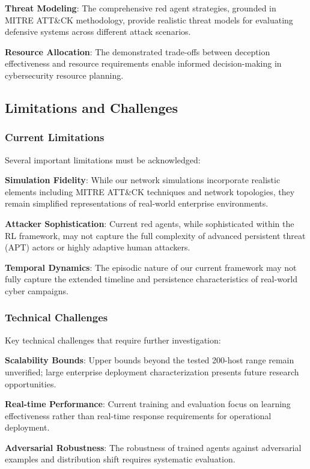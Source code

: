 \documentclass[12pt,oneside,a4paper]{article}
\theoremstyle{definition}
\theoremstyle{plain}
\begin{document}
\textbf{Threat Modeling}: The comprehensive red agent strategies, grounded in MITRE ATT\&CK methodology, provide realistic threat models for evaluating defensive systems across different attack scenarios.

\textbf{Resource Allocation}: The demonstrated trade-offs between deception effectiveness and resource requirements enable informed decision-making in cybersecurity resource planning.

\subsection{Limitations and Challenges}

\subsubsection{Current Limitations}
Several important limitations must be acknowledged:

\textbf{Simulation Fidelity}: While our network simulations incorporate realistic elements including MITRE ATT\&CK techniques and network topologies, they remain simplified representations of real-world enterprise environments.

\textbf{Attacker Sophistication}: Current red agents, while sophisticated within the RL framework, may not capture the full complexity of advanced persistent threat (APT) actors or highly adaptive human attackers.

\textbf{Temporal Dynamics}: The episodic nature of our current framework may not fully capture the extended timeline and persistence characteristics of real-world cyber campaigns.

\subsubsection{Technical Challenges}
Key technical challenges that require further investigation:

\textbf{Scalability Bounds}: Upper bounds beyond the tested 200-host range remain unverified; large enterprise deployment characterization presents future research opportunities.

\textbf{Real-time Performance}: Current training and evaluation focus on learning effectiveness rather than real-time response requirements for operational deployment.

\textbf{Adversarial Robustness}: The robustness of trained agents against adversarial examples and distribution shift requires systematic evaluation.
\end{document}
